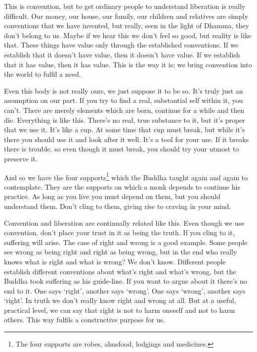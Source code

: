 This is convention, but to get ordinary people to understand liberation is really difficult. Our money, our house, our family, our children and relatives are simply conventions that we have invented, but really, seen in the light of Dhamma, they don't belong to us. Maybe if we hear this we don't feel so good, but reality is like that. These things have value only through the established conventions. If we establish that it doesn't have value, then it doesn't have value. If we establish that it has value, then it has value. This is the way it is; we bring convention into the world to fulfil a need.

Even this body is not really ours, we just suppose it to be so. It's truly just an assumption on our part. If you try to find a real, substantial self within it, you can't. There are merely elements which are born, continue for a while and then die. Everything is like this. There's no real, true substance to it, but it's proper that we use it. It's like a cup. At some time that cup must break, but while it's there you should use it and look after it well. It's a tool for your use. If it breaks there is trouble, so even though it must break, you should try your utmost to preserve it.

And so we have the four supports\footnote{The four supports are robes, almsfood, lodgings and medicines.} which the Buddha taught again and again to contemplate. They are the supports on which a monk depends to continue his practice. As long as you live you must depend on them, but you should understand them. Don't cling to them, giving rise to craving in your mind.

Convention and liberation are continually related like this. Even though we use convention, don't place your trust in it as being the truth. If you cling to it, suffering will arise. The case of right and wrong is a good example. Some people see wrong as being right and right as being wrong, but in the end who really knows what is right and what is wrong? We don't know. Different people establish different conventions about what's right and what's wrong, but the Buddha took suffering as his guide-line. If you want to argue about it there's no end to it. One says `right', another says `wrong'. One says `wrong', another says `right'. In truth we don't really know right and wrong at all. But at a useful, practical level, we can say that right is not to harm oneself and not to harm others. This way fulfils a constructive purpose for us.

